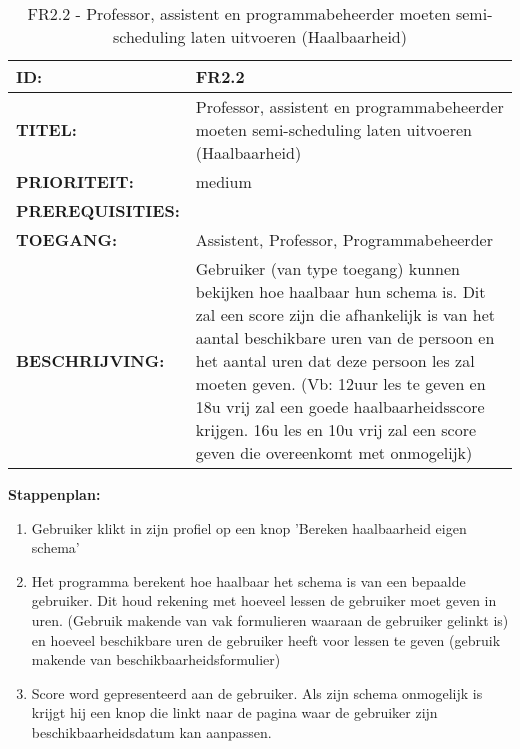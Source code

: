 \noindent\begin{table}[H]
	\begin{tabular}{l | p{10cm}}
    \textbf{ID:} & FR2.2 \\ \hline
    \textbf{TITEL:} & Professor, assistent en programmabeheerder moeten semi-scheduling laten uitvoeren (Haalbaarheid)\\ \hline
    \textbf{PRIORITEIT:} &  medium \\ \hline
    \textbf{PREREQUISITIES:} & \\ \hline
    \textbf{TOEGANG:} & Assistent, Professor, Programmabeheerder \\ \hline
    \textbf{BESCHRIJVING:} & Gebruiker (van type toegang) kunnen bekijken hoe haalbaar hun schema is. Dit zal een score zijn die afhankelijk is van het aantal beschikbare uren van de persoon en het aantal uren dat deze persoon les zal moeten geven. (Vb: 12uur les te geven en 18u vrij zal een goede haalbaarheidsscore krijgen. 16u les en 10u vrij zal een score geven die overeenkomt met onmogelijk)\\
    \end{tabular}
    \caption{FR2.2 - Professor, assistent en programmabeheerder moeten semi-scheduling laten uitvoeren (Haalbaarheid)}
    \label{tab:FR2.2 - Professor, assistent en programmabeheerder moeten semi-scheduling laten uitvoeren (Haalbaarheid)}
\end{table}

\textbf{Stappenplan:}
	\begin{enumerate}
	\item Gebruiker klikt in zijn profiel op een knop 'Bereken haalbaarheid eigen schema'
	\item Het programma berekent hoe haalbaar het schema is van een bepaalde gebruiker. Dit houd rekening met hoeveel lessen de gebruiker moet geven in uren. (Gebruik makende van vak formulieren waaraan de gebruiker gelinkt is) en hoeveel beschikbare uren de gebruiker heeft voor lessen te geven (gebruik makende van beschikbaarheidsformulier)
	\item Score word gepresenteerd aan de gebruiker. Als zijn schema onmogelijk is krijgt hij een knop die linkt naar de pagina waar de gebruiker zijn beschikbaarheidsdatum kan aanpassen.
	\end{enumerate}
        
        
        
